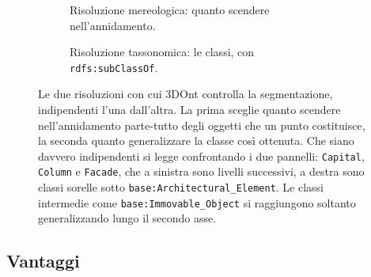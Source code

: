 \begin{figure}[htb]
  \centering
  \begin{subfigure}[b]{0.36\textwidth}
    \centering
    
    \caption{Risoluzione mereologica: quanto scendere nell'annidamento.}
    \label{fig:mereologia}
  \end{subfigure}
  \hfill
  \begin{subfigure}[b]{0.60\textwidth}
    \centering
    
    \caption{Risoluzione tassonomica: le classi, con \texttt{rdfs:subClassOf}.}
    \label{fig:tassonomia}
  \end{subfigure}
  \caption{Le due risoluzioni con cui 3DOnt controlla la segmentazione, indipendenti l'una dall'altra. La prima sceglie quanto scendere nell'annidamento parte-tutto degli oggetti che un punto costituisce, la seconda quanto generalizzare la classe così ottenuta. Che siano davvero indipendenti si legge confrontando i due pannelli: \texttt{Capital}, \texttt{Column} e \texttt{Facade}, che a sinistra sono livelli successivi, a destra sono classi sorelle sotto \texttt{base:Architectural\_Element}. Le classi intermedie come \texttt{base:Immovable\_Object} si raggiungono soltanto generalizzando lungo il secondo asse.}
  \label{fig:gerarchie}
\end{figure}

\subsection{Vantaggi}

